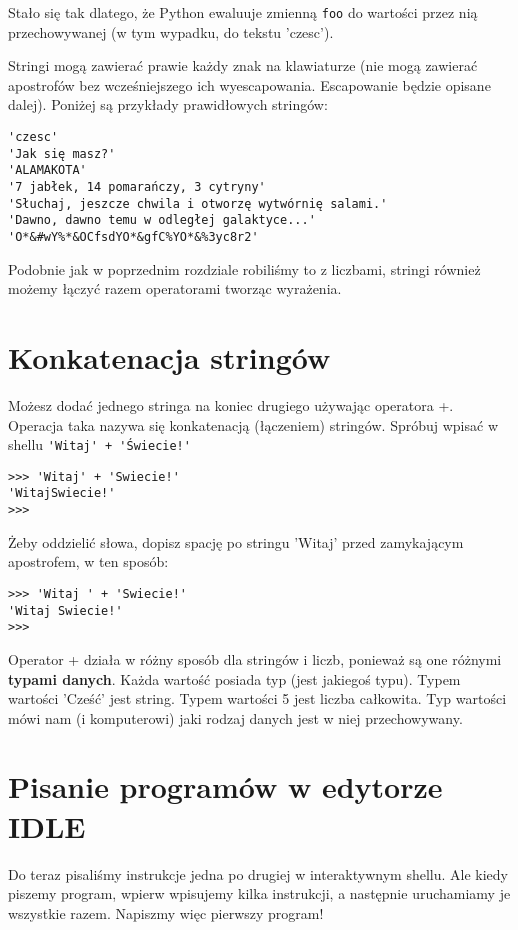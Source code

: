 \documentclass{book}
\begin{document}
Stało się tak dlatego, że Python ewaluuje zmienną \lstinline{foo} do wartości przez nią przechowywanej (w tym wypadku, do tekstu 'czesc').

Stringi mogą zawierać prawie każdy znak na klawiaturze (nie mogą zawierać apostrofów bez wcześniejszego ich wyescapowania. Escapowanie będzie opisane dalej). Poniżej są przykłady prawidłowych stringów:


\begin{lstlisting}
'czesc'
'Jak się masz?'
'ALAMAKOTA'
'7 jabłek, 14 pomarańczy, 3 cytryny'
'Słuchaj, jeszcze chwila i otworzę wytwórnię salami.'
'Dawno, dawno temu w odległej galaktyce...'
'O*&#wY%*&OCfsdYO*&gfC%YO*&%3yc8r2'
\end{lstlisting}

Podobnie jak w poprzednim rozdziale robiliśmy to z liczbami, stringi również możemy łączyć razem operatorami tworząc wyrażenia.

\section{Konkatenacja stringów}

Możesz dodać jednego stringa na koniec drugiego używając operatora +. Operacja taka nazywa się konkatenacją (łączeniem) stringów. Spróbuj wpisać w shellu \lstinline{'Witaj' + 'Świecie!'}

\begin{lstlisting}
>>> 'Witaj' + 'Swiecie!'
'WitajSwiecie!'
>>>
\end{lstlisting}

Żeby oddzielić słowa, dopisz spację po stringu 'Witaj' przed zamykającym apostrofem, w ten sposób:

\begin{lstlisting}
>>> 'Witaj ' + 'Swiecie!'
'Witaj Swiecie!'
>>> 
\end{lstlisting}

Operator + działa w różny sposób dla stringów i liczb, ponieważ są one różnymi {\bf typami danych}. Każda wartość posiada typ (jest jakiegoś typu). Typem wartości 'Cześć' jest string. Typem wartości 5 jest liczba całkowita. Typ wartości mówi nam (i komputerowi) jaki rodzaj danych jest w niej przechowywany. 

\section{Pisanie programów w edytorze IDLE}

Do teraz pisaliśmy instrukcje jedna po drugiej w interaktywnym shellu. Ale kiedy piszemy program, wpierw wpisujemy kilka instrukcji, a następnie uruchamiamy je wszystkie razem. Napiszmy więc pierwszy program!
\end{document}
